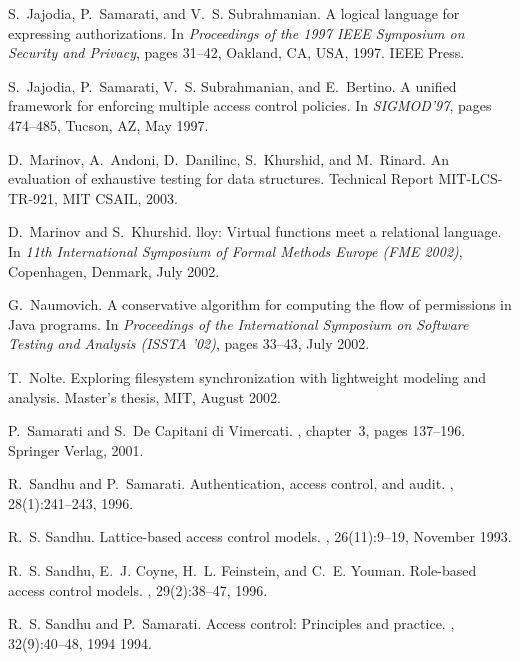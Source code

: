 \documentclass{acm_proc_article-sp}
\begin{document}
\begin{thebibliography}{10}
S.~Jajodia, P.~Samarati, and V.~S. Subrahmanian.
\newblock A logical language for expressing authorizations.
\newblock In {\em Proceedings of the 1997 IEEE Symposium on Security and
  Privacy}, pages 31--42, Oakland, CA, USA, 1997. IEEE Press.

S.~Jajodia, P.~Samarati, V.~S. Subrahmanian, and E.~Bertino.
\newblock A unified framework for enforcing multiple access control policies.
\newblock In {\em SIGMOD'97}, pages 474--485, Tucson, AZ, May 1997.

D.~Marinov, A.~Andoni, D.~Danilinc, S.~Khurshid, and M.~Rinard.
\newblock An evaluation of exhaustive testing for data structures.
\newblock Technical Report MIT-LCS-TR-921, MIT CSAIL, 2003.

D.~Marinov and S.~Khurshid.
lloy: Virtual functions meet a relational language.
\newblock In {\em 11th International Symposium of Formal Methods Europe (FME
  2002)}, Copenhagen, Denmark, July 2002.

G.~Naumovich.
\newblock A conservative algorithm for computing the flow of permissions in
  {J}ava programs.
\newblock In {\em Proceedings of the International Symposium on Software
  Testing and Analysis ({ISSTA} '02)}, pages 33--43, July 2002.

T.~Nolte.
\newblock Exploring filesystem synchronization with lightweight modeling and
  analysis.
\newblock Master's thesis, MIT, August 2002.

P.~Samarati and S.~{De Capitani di Vimercati}.
, chapter~3, pages
  137--196.
\newblock Springer Verlag, 2001.

R.~Sandhu and P.~Samarati.
\newblock Authentication, access control, and audit.
, 28(1):241--243, 1996.

R.~S. Sandhu.
\newblock Lattice-based access control models.
, 26(11):9--19, November 1993.

R.~S. Sandhu, E.~J. Coyne, H.~L. Feinstein, and C.~E. Youman.
\newblock Role-based access control models.
, 29(2):38--47, 1996.

R.~S. Sandhu and P.~Samarati.
\newblock Access control: Principles and practice.
, 32(9):40--48, 1994 1994.


\end{thebibliography}
\end{document}
